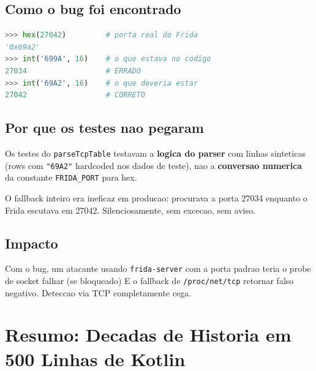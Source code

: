 \documentclass[12pt,a4paper]{article}
\begin{document}
\subsection{Como o bug foi encontrado}

\begin{lstlisting}[language=Python]
>>> hex(27042)         # porta real do Frida
'0x69a2'
>>> int('699A', 16)    # o que estava no codigo
27034                  # ERRADO
>>> int('69A2', 16)    # o que deveria estar
27042                  # CORRETO
\end{lstlisting}

\subsection{Por que os testes nao pegaram}

Os testes do \texttt{parseTcpTable} testavam a \textbf{logica do parser}
com linhas sinteticas (rows com \texttt{"69A2"} hardcoded nos dados de teste),
nao a \textbf{conversao numerica} da constante \texttt{FRIDA\_PORT} para hex.

O fallback inteiro era ineficaz em producao: procurava a porta 27034
enquanto o Frida escutava em 27042. Silenciosamente, sem excecao, sem aviso.

\subsection{Impacto}

Com o bug, um atacante usando \texttt{frida-server} com a porta padrao teria
o probe de socket falhar (se bloqueado) E o fallback de \texttt{/proc/net/tcp}
retornar falso negativo. Deteccao via TCP completamente cega.

\newpage

\section{Resumo: Decadas de Historia em 500 Linhas de Kotlin}
\end{document}
